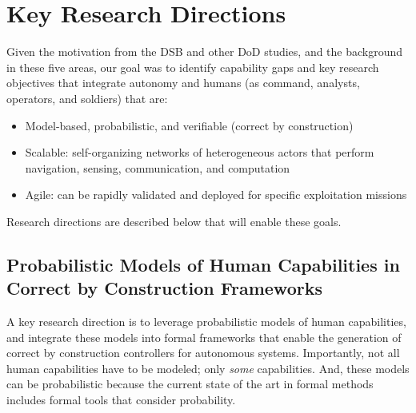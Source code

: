 
\section*{Key Research Directions}

%

Given the motivation from the DSB and other DoD studies, and the background in these five areas, our goal was to identify capability gaps and key research objectives that integrate autonomy and humans (as command, analysts, operators, and soldiers) that are:\vspace*{-0.1 in}
\begin{itemize}
\item Model-based, probabilistic, and verifiable (correct by construction)\vspace*{-0.1 in}
\item Scalable: self-organizing networks of heterogeneous actors that perform navigation, sensing, communication, and computation\vspace*{-0.1 in}
\item Agile: can be rapidly validated and deployed for specific exploitation missions\vspace*{-0.1 in}
\end{itemize}

Research directions are described below that will enable these goals. 

\subsection*{Probabilistic Models of Human Capabilities in Correct by Construction Frameworks}

A key research direction is to leverage probabilistic models of human capabilities, and integrate these models into formal frameworks that enable the generation of correct by construction controllers for autonomous systems. Importantly, not all human capabilities have to be modeled; only {\it some} capabilities. And, these models can be probabilistic because the current state of the art in formal methods includes formal tools that consider probability. 

